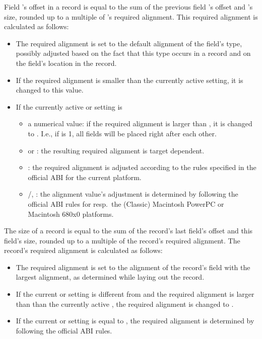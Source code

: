 Field 's offset in a record is equal to the sum of the previous
field 's offset and 's size, rounded up to a multiple of
's required alignment. This required alignment is calculated as
follows:
\begin{itemize}
\item The required alignment is set to the default alignment of the
field's type, possibly adjusted based on the fact that this type occurs
in a record and on the field's location in the record.
\item If the required alignment is smaller than the currently active
 setting, it is changed to this 
value.
\item If the currently active  or
 setting is
  \begin{itemize}
  \item a numerical value: if the required alignment is larger than
  , it is changed to . I.e., if  is 1, all fields
  will be placed right after each other.
  \item {} or : the resulting required alignment
  is target dependent.
  \item {}: the required alignment is adjusted according to the
  rules specified in the official ABI for the current platform.
  \item {}/, : the alignment value's
  adjustment is determined by following the official ABI rules for
  resp.\ the (Classic) Macintosh PowerPC or Macintosh 680x0 platforms.
  \end{itemize}
\end{itemize}

The size of a record is equal to the sum of the record's last field's
offset and this field's size, rounded up to a multiple of the record's
required alignment. The record's required alignment is calculated as
follows:
\begin{itemize}
  \item The required alignment is set to the alignment of the record's
  field with the largest alignment, as determined while laying out the
  record.
  \item If the current  or  setting is different from  and the required alignment is
  larger than than the currently active , the required alignment is changed to .
  \item If the current  or  setting is equal to , the required alignment is determined
  by following the official ABI rules.
\end{itemize}

